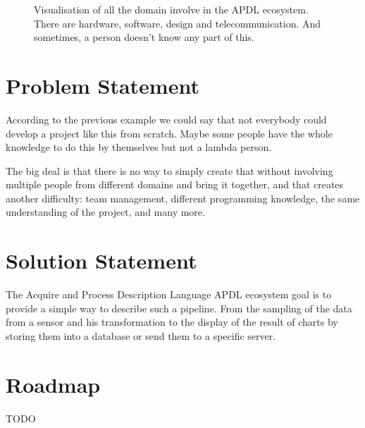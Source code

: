 \begin{figure}[ht]
  \centering
  \caption[Basic APDL architecture example]{ Visualisation of all the domain
involve in the APDL ecosystem. There are hardware, software, design and
telecommunication. And sometimes, a person doesn't know any part of this.}
  \label{fig:basic_archi}
\end{figure}

\section{Problem Statement}
\label{sec:intro-problem-statement}

According to the previous example we could say that not everybody could develop
a project like this from scratch. Maybe some people have the whole knowledge to
do this by themselves but not a lambda person.

The big deal is that there is no way to simply create that without involving
multiple people from different domains and bring it together, and that creates
another difficulty: team management, different programming knowledge, the same
understanding of the project, and many more.

\section{Solution Statement}
\label{sec:intro-solution-statement}

The Acquire and Process Description Language \gls{APDL} ecosystem goal is to
provide a simple way to describe such a pipeline. From the sampling of the data
from a sensor and his transformation to the display of the result of charts by
storing them into a database or send them to a specific server.

\section{Roadmap}
\label{sec:intro-roadmap}

TODO

